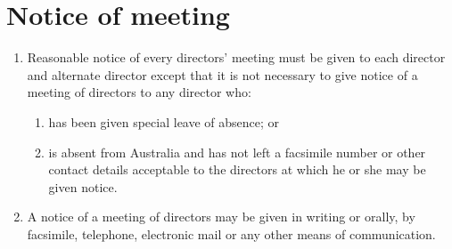 \section{Notice of meeting}

\begin{enumerate}[label=(\alph*)]
    \item Reasonable notice of every directors' meeting must be given to each director and alternate director except that it is not necessary to give notice of a meeting of directors to any director who:
    \begin{enumerate}[label=(\roman*)]
        \item has been given special leave of absence; or
        \item is absent from Australia and has not left a facsimile number or other contact details acceptable to the directors at which he or she may be given notice.
    \end{enumerate}
    
    \item A notice of a meeting of directors may be given in writing or orally, by facsimile, telephone, electronic mail or any other means of communication.
\end{enumerate} 